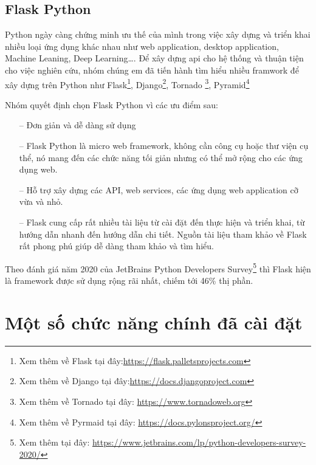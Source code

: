 \subsection{Flask Python}
Python ngày càng chứng minh ưu thế của mình trong việc xây dựng và triển khai nhiều loại ứng dụng khác nhau như web application, desktop application, Machine Leaning, Deep Learning….
Để xây dựng \ac{api} cho hệ thống và thuận tiện cho việc nghiên cứu, nhóm chúng em đã tiến hành tìm hiểu nhiều framwork để xây dựng trên Python như Flask\footnote{Xem thêm về Flask tại đây:\url{https://flask.palletsprojects.com}}, Django\footnote{Xem thêm về Django tại đây:\url{https://docs.djangoproject.com}}, Tornado \footnote{Xem thêm về Tornado tại đây: \url{https://www.tornadoweb.org}}, Pyramid\footnote{Xem thêm về Pyrmaid tại đây: \url{https://docs.pylonsproject.org/}}

Nhóm quyết định chọn Flask Python vì các ưu điểm sau:
\begin{itemize}
    \item[--] Đơn giản và dễ dàng sử dụng
    \item[--] Flask Python là micro web framework, không cần công cụ hoặc thư viện cụ thể, nó mang đến các chức năng tối giản nhưng có thể mở rộng cho các ứng dụng web.
    \item[--] Hỗ trợ xây dựng các API, web services, các ứng dụng web application cỡ vừa và nhỏ.
    \item[--] Flask cung cấp rất nhiều tài liệu từ cài đặt đến thực hiện và triển khai, từ hướng dẫn nhanh đến hướng dẫn chi tiết. Nguồn tài liệu tham khảo về Flask rất phong phú giúp dễ dàng tham khảo và tìm hiểu.
\end{itemize}

Theo đánh giá năm 2020 của JetBrains Python Developers Survey\footnote{Xem thêm tại đây: \url{https://www.jetbrains.com/lp/python-developers-survey-2020/}} thì Flask hiện là framework được sử dụng rộng rãi nhất, chiếm tới 46\% thị phần.  

\section{Một số chức năng chính đã cài đặt}

